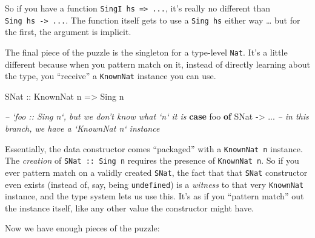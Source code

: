 \documentclass[]{article}
\newenvironment{Shaded}{}{}
\newcommand{\KeywordTok}[1]{\textcolor[rgb]{0.00,0.44,0.13}{\textbf{{#1}}}}
\newcommand{\DataTypeTok}[1]{\textcolor[rgb]{0.56,0.13,0.00}{{#1}}}
\newcommand{\CommentTok}[1]{\textcolor[rgb]{0.38,0.63,0.69}{\textit{{#1}}}}
\newcommand{\OtherTok}[1]{\textcolor[rgb]{0.00,0.44,0.13}{{#1}}}
\newcommand{\FunctionTok}[1]{\textcolor[rgb]{0.02,0.16,0.49}{{#1}}}
\newcommand{\NormalTok}[1]{{#1}}
\begin{document}
So if you have a function \texttt{SingI\ hs\ =\textgreater{}\ ...}, it's really
no different than \texttt{Sing\ hs\ -\textgreater{}\ ...}. The function itself
gets to use a \texttt{Sing\ hs} either way \ldots{} but for the first, the
argument is implicit.

The final piece of the puzzle is the singleton for a type-level \texttt{Nat}.
It's a little different because when you pattern match on it, instead of
directly learning about the type, you ``receive'' a \texttt{KnownNat} instance
you can use.

\begin{Shaded}
\begin{Highlighting}[]
\DataTypeTok{SNat}\OtherTok{ ::} \DataTypeTok{KnownNat} \NormalTok{n }\OtherTok{=>} \DataTypeTok{Sing} \NormalTok{n}
\end{Highlighting}
\end{Shaded}

\begin{Shaded}
\begin{Highlighting}[]
\CommentTok{-- `foo :: Sing n`, but we don't know what `n` it is}
\KeywordTok{case} \NormalTok{foo }\KeywordTok{of}
  \DataTypeTok{SNat} \OtherTok{->} \FunctionTok{...}   \CommentTok{-- in this branch, we have a `KnownNat n` instance}
\end{Highlighting}
\end{Shaded}

Essentially, the data constructor comes ``packaged'' with a \texttt{KnownNat\ n}
instance. The \emph{creation} of \texttt{SNat\ ::\ Sing\ n} requires the
presence of \texttt{KnownNat\ n}. So if you ever pattern match on a validly
created \texttt{SNat}, the fact that that \texttt{SNat} constructor even exists
(instead of, say, being \texttt{undefined}) is a \emph{witness} to that very
\texttt{KnownNat} instance, and the type system lets us use this. It's as if you
``pattern match'' out the instance itself, like any other value the constructor
might have.

Now we have enough pieces of the puzzle:
\end{document}
